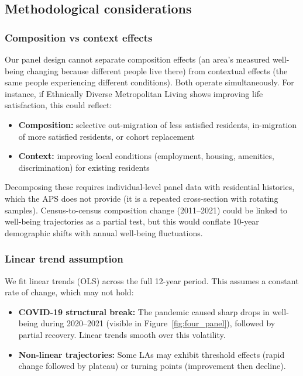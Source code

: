 \documentclass[12pt,a4paper]{article}
\begin{document}
\subsection{Methodological considerations}

\subsubsection{Composition vs context effects}

Our panel design cannot separate composition effects (an area's measured well-being changing because different people live there) from contextual effects (the same people experiencing different conditions). Both operate simultaneously. For instance, if Ethnically Diverse Metropolitan Living shows improving life satisfaction, this could reflect:
\begin{itemize}
\item \textbf{Composition:} selective out-migration of less satisfied residents, in-migration of more satisfied residents, or cohort replacement
\item \textbf{Context:} improving local conditions (employment, housing, amenities, discrimination) for existing residents
\end{itemize}

Decomposing these requires individual-level panel data with residential histories, which the APS does not provide (it is a repeated cross-section with rotating samples). Census-to-census composition change (2011--2021) could be linked to well-being trajectories as a partial test, but this would conflate 10-year demographic shifts with annual well-being fluctuations.

\subsubsection{Linear trend assumption}

We fit linear trends (OLS) across the full 12-year period. This assumes a constant rate of change, which may not hold:
\begin{itemize}
\item \textbf{COVID-19 structural break:} The pandemic caused sharp drops in well-being during 2020--2021 (visible in Figure~\ref{fig:four_panel}), followed by partial recovery. Linear trends smooth over this volatility.
\item \textbf{Non-linear trajectories:} Some LAs may exhibit threshold effects (rapid change followed by plateau) or turning points (improvement then decline).
\end{itemize}
\end{document}
